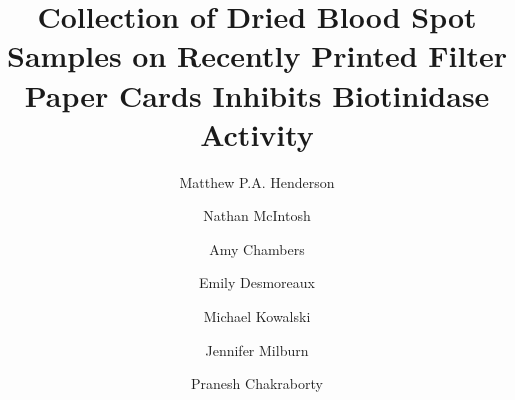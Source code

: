 \documentclass[review]{elsarticle}
\date{}
\title{}
\begin{document}
\makeatletter
\newcommand{\citeprocitem}[2]{\hyper@linkstart{cite}{citeproc_bib_item_#1}#2\hyper@linkend}
\makeatother



\begin{frontmatter}
\title{Collection of Dried Blood Spot Samples on Recently Printed Filter Paper Cards Inhibits Biotinidase Activity}
\author[NSO]{Matthew P.A. Henderson}
\author[NSO]{Nathan McIntosh}
\author[NSO]{Amy Chambers}
\author[NSO]{Emily Desmoreaux}
\author[NSO]{Michael Kowalski}
\author[NSO]{Jennifer Milburn}
\author[NSO]{Pranesh Chakraborty}
\address[NSO]{Newborn Screening Ontario, Children's Hospital of Eastern Ontario, 415 Smyth Rd, Ottawa Ontario}
\end{frontmatter}
\end{document}
